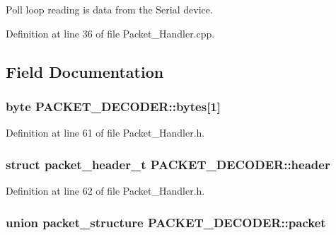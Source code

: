 Poll loop reading is data from the Serial device. 

Definition at line 36 of file Packet\-\_\-\-Handler.\-cpp.



\subsection{Field Documentation}
\hypertarget{class_p_a_c_k_e_t___d_e_c_o_d_e_r_a3a8595440adaa5f907b2029e9c2b6d57}{
\subsubsection[{bytes}]{\setlength{\rightskip}{0pt plus 5cm}byte P\-A\-C\-K\-E\-T\-\_\-\-D\-E\-C\-O\-D\-E\-R\-::bytes\mbox{[}1\mbox{]}}}\label{class_p_a_c_k_e_t___d_e_c_o_d_e_r_a3a8595440adaa5f907b2029e9c2b6d57}


Definition at line 61 of file Packet\-\_\-\-Handler.\-h.

\hypertarget{class_p_a_c_k_e_t___d_e_c_o_d_e_r_a7cd4fb2129d42e8e83d6293f8b67f901}{
\subsubsection[{header}]{\setlength{\rightskip}{0pt plus 5cm}struct {\bf packet\-\_\-header\-\_\-t} P\-A\-C\-K\-E\-T\-\_\-\-D\-E\-C\-O\-D\-E\-R\-::header}}\label{class_p_a_c_k_e_t___d_e_c_o_d_e_r_a7cd4fb2129d42e8e83d6293f8b67f901}


Definition at line 62 of file Packet\-\_\-\-Handler.\-h.

\hypertarget{class_p_a_c_k_e_t___d_e_c_o_d_e_r_aa4c9ad25d35d2611b1d2c1a138a1a811}{
\subsubsection[{packet}]{\setlength{\rightskip}{0pt plus 5cm}union packet\-\_\-structure P\-A\-C\-K\-E\-T\-\_\-\-D\-E\-C\-O\-D\-E\-R\-::packet}}\label{class_p_a_c_k_e_t___d_e_c_o_d_e_r_aa4c9ad25d35d2611b1d2c1a138a1a811}


